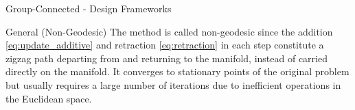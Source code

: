 \documentclass[journal]{IEEEtran}
\begin{document}
\begin{section}{Group-Connected - Design Frameworks}
\begin{subsection}{General (Non-Geodesic) }
		The method is called non-geodesic since the addition \eqref{eq:update_additive} and retraction \eqref{eq:retraction} in each step constitute a zigzag path departing from and returning to the manifold, instead of carried directly on the manifold.
		It converges to stationary points of the original problem but usually requires a large number of iterations due to inefficient operations in the Euclidean space.
	\end{subsection}



\end{section}
\end{document}
